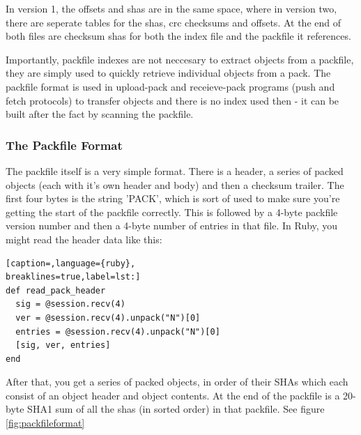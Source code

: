 In version 1, the offsets and shas are in the same space, where in version two,
there are seperate tables for the shas, crc checksums and offsets. At the end
of both files are checksum shas for both the index file and the packfile it
references.

Importantly, packfile indexes are not neccesary to extract objects from a
packfile, they are simply used to quickly retrieve individual objects from a
pack. The packfile format is used in upload-pack and receieve-pack programs
(push and fetch protocols) to transfer objects and there is no index used then
- it can be built after the fact by scanning the packfile.

\subsubsection{The Packfile Format}
The packfile itself is a very simple format. There is a header, a series of
packed objects (each with it's own header and body) and then a checksum
trailer. The first four bytes is the string 'PACK', which is sort of used to
make sure you're getting the start of the packfile correctly. This is followed
by a 4-byte packfile version number and then a 4-byte number of entries in that
file. In Ruby, you might read the header data like this:
\lstset{basicstyle=\scriptsize, numbers=none, captionpos=b, tabsize=4}
\begin{lstlisting}[caption=,language={ruby},
breaklines=true,label=lst:]
def read_pack_header
  sig = @session.recv(4)
  ver = @session.recv(4).unpack("N")[0]
  entries = @session.recv(4).unpack("N")[0]
  [sig, ver, entries]
end
\end{lstlisting}

After that, you get a series of packed objects, in order of their SHAs which
each consist of an object header and object contents. At the end of the
packfile is a 20-byte SHA1 sum of all the shas (in sorted order) in that
packfile. See figure \ref{fig:packfileformat}

